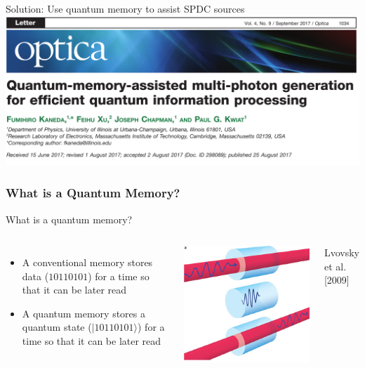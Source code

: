 \documentclass{beamer}
\begin{document}
\begin{frame}{Solution: Use quantum memory to assist SPDC sources}
    \includegraphics[width=1.0\textwidth]{Images/PaperTitle.png}
\end{frame}

\begin{frame}\frametitle{What is a Quantum Memory?}
    \begin{block}{What is a quantum memory?}
        \begin{columns}
            \begin{itemize}
                \item A conventional memory stores data ($10110101$) for a time so that it can be later read
                \item A quantum memory stores a quantum state ($|10110101\rangle$) for a time so that it can be later read
            \end{itemize}
            \centering
            \includegraphics[width=1.0\textwidth]{Images/QuantMem.jpg}

            \tiny{Lvovsky et al. [2009]}
        \end{columns}
    \end{block}
\end{frame}
\end{document}
